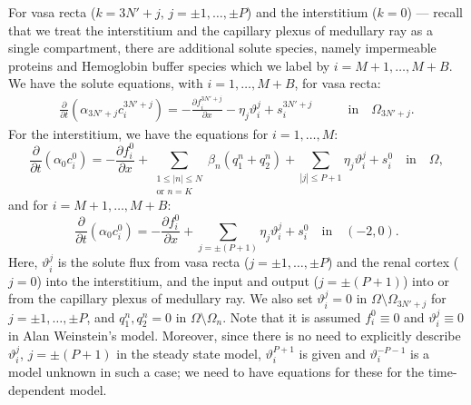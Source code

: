 \documentclass{article}
\begin{document}
For vasa recta ($k=3N'+j,\,j=\pm 1,\dots,\pm P$) and the interstitium ($k=0$) --- recall that we treat the interstitium and the capillary plexus of medullary ray as a single compartment, there are additional solute species, namely impermeable proteins and Hemoglobin buffer species which we label by $i=M+1,\dots,M+B$.
We have the solute equations, with $i=1,\dots,M+B$, for vasa recta:
\begin{align}
    \frac{\partial }{\partial t}(\alpha_{3N'+j}c_i^{3N'+j}) = - \frac{\partial f_i^{3N'+j}}{\partial x} -\eta_{j}\vartheta_i^j+s_i^{3N'+j}\qquad &\text{in}\quad \Omega_{3N'+j}.
\end{align}
For the interstitium, we have the equations for $i=1,\dots,M$:
\begin{equation}
    \frac{\partial}{\partial t}(\alpha_0 c_i^0) = - \frac{\partial f_i^0}{\partial x} + 
        \sum_{\substack{1\leq|n|\leq N\\\text{or } n=K}}\beta_n(q_{1}^n+q_{2}^n)+\sum_{|j|\leq P+1}\eta_j\vartheta_i^j+s_i^0\quad \text{in}\quad \Omega,
\end{equation}
    and for $i=M+1,\dots,M+B$:
\begin{equation}
    \frac{\partial}{\partial t}(\alpha_0 c_i^0) = - \frac{\partial f_i^0}{\partial x} + 
    \sum_{j=\pm(P+1)}\eta_j\vartheta_i^j+s_i^0\quad \text{in}\quad (-2,0).
\end{equation}
Here, $\vartheta_i^j$ is the solute flux from vasa recta ($j=\pm 1,\dots,\pm P$) and the renal cortex ($j=0$) into the interstitium, and the input and output ($j=\pm(P+1)$) into or from the capillary plexus of medullary ray.
We also set $\vartheta_i^j=0$ in $\Omega\setminus \Omega_{3N'+j}$ for $j=\pm 1,\dots,\pm P$, and $q_1^n,q_2^n=0$ in $\Omega\setminus\Omega_n$.
Note that it is assumed $f_i^0\equiv 0$ and $\vartheta_i^j\equiv 0$ in Alan Weinstein's model.
Moreover, since there is no need to explicitly describe $\vartheta_i^j$, $j=\pm(P+1)$ in the steady state model, $\vartheta_i^{P+1}$ is given and $\vartheta_i^{-P-1}$ is a model unknown in such a case; we need to have equations for these for the time-dependent model.
\end{document}
